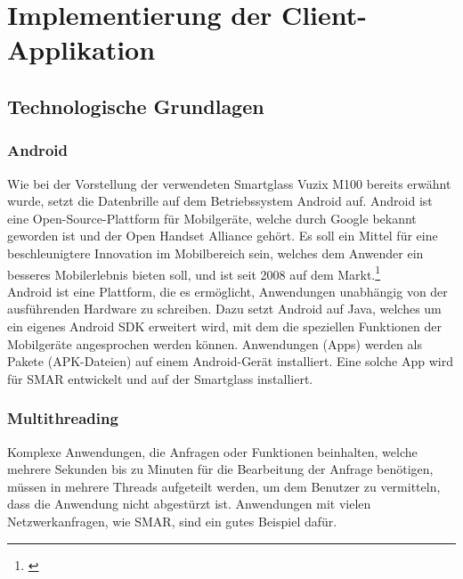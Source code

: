 \chapter{Implementierung der Client-Applikation}
\label{cha:impl_device}

\section{Technologische Grundlagen}
\subsection{Android}
Wie bei der Vorstellung der verwendeten Smartglass Vuzix M100 bereits erwähnt wurde, setzt die Datenbrille auf dem Betriebssystem Android auf. Android ist eine Open-Source-Plattform für Mobilgeräte, welche durch Google bekannt geworden ist und der Open Handset Alliance gehört. Es soll ein Mittel für eine beschleunigtere Innovation im Mobilbereich sein, welches dem Anwender ein besseres Mobilerlebnis bieten soll, und ist seit 2008 auf dem Markt.\footnote{\citep{android_general}}\\
Android ist eine Plattform, die es ermöglicht, Anwendungen unabhängig von der ausführenden Hardware zu schreiben. Dazu setzt Android auf Java, welches um ein eigenes Android SDK erweitert wird, mit dem die speziellen Funktionen der Mobilgeräte angesprochen werden können. Anwendungen (Apps) werden als Pakete (APK-Dateien) auf einem Android-Gerät installiert. Eine solche App wird für \acs{SMAR} entwickelt und auf der Smartglass installiert.

\subsection{Multithreading}
Komplexe Anwendungen, die Anfragen oder Funktionen beinhalten, welche mehrere Sekunden bis zu Minuten für die Bearbeitung der Anfrage benötigen, müssen in mehrere Threads aufgeteilt werden, um dem Benutzer zu vermitteln, dass die Anwendung nicht abgestürzt ist. Anwendungen mit vielen Netzwerkanfragen, wie \zB \ac{SMAR}, sind ein gutes Beispiel dafür.\\

